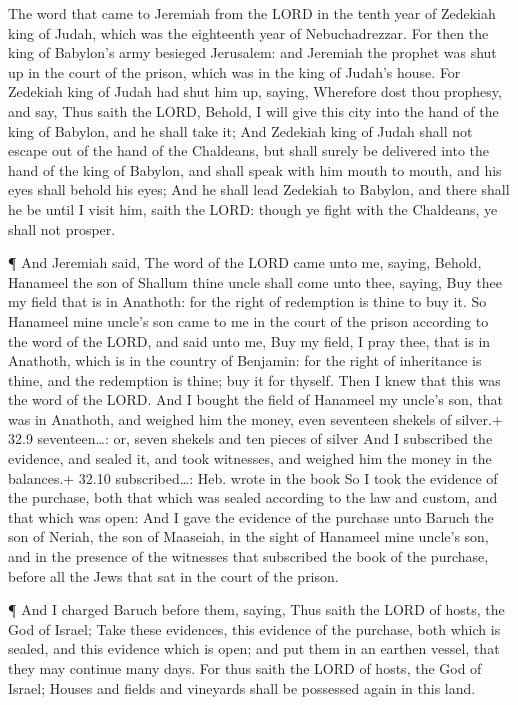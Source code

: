 The word that came to Jeremiah from the LORD in the tenth
year of Zedekiah king of Judah, which was the eighteenth year of
Nebuchadrezzar.  For then the king of Babylon's army
besieged Jerusalem: and Jeremiah the prophet was shut up in the court of
the prison, which was in the king of Judah's house.  For
Zedekiah king of Judah had shut him up, saying, Wherefore dost thou
prophesy, and say, Thus saith the LORD, Behold, I will give this city
into the hand of the king of Babylon, and he shall take it; 
And Zedekiah king of Judah shall not escape out of the hand of the
Chaldeans, but shall surely be delivered into the hand of the king of
Babylon, and shall speak with him mouth to mouth, and his eyes shall
behold his eyes;  And he shall lead Zedekiah to Babylon, and
there shall he be until I visit him, saith the LORD: though ye fight
with the Chaldeans, ye shall not prosper.

 ¶ And Jeremiah said, The word of the LORD came unto me,
saying,  Behold, Hanameel the son of Shallum thine uncle
shall come unto thee, saying, Buy thee my field that is in Anathoth: for
the right of redemption is thine to buy it.  So Hanameel
mine uncle's son came to me in the court of the prison according to the
word of the LORD, and said unto me, Buy my field, I pray thee, that is
in Anathoth, which is in the country of Benjamin: for the right of
inheritance is thine, and the redemption is thine; buy it for thyself.
Then I knew that this was the word of the LORD.  And I
bought the field of Hanameel my uncle's son, that was in Anathoth, and
weighed him the money, even seventeen shekels of silver.+ 32.9
seventeen\ldots: or, seven shekels and ten pieces of silver
 And I subscribed the evidence, and sealed it, and took
witnesses, and weighed him the money in the balances.+ 32.10
subscribed\ldots: Heb. wrote in the book  So I took the
evidence of the purchase, both that which was sealed according to the
law and custom, and that which was open:  And I gave the
evidence of the purchase unto Baruch the son of Neriah, the son of
Maaseiah, in the sight of Hanameel mine uncle's son, and in the presence
of the witnesses that subscribed the book of the purchase, before all
the Jews that sat in the court of the prison.

 ¶ And I charged Baruch before them, saying, 
Thus saith the LORD of hosts, the God of Israel; Take these evidences,
this evidence of the purchase, both which is sealed, and this evidence
which is open; and put them in an earthen vessel, that they may continue
many days.  For thus saith the LORD of hosts, the God of
Israel; Houses and fields and vineyards shall be possessed again in this
land.

